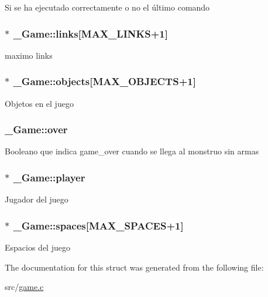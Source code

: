 Si se ha ejecutado correctamente o no el último comando \hypertarget{struct__Game_a672f97aff892c65a6fdb43665cb57c97}{
\subsubsection[{links}]{$\ast$ \+\_\+\+Game\+::links\mbox{[}{\bf M\+A\+X\+\_\+\+L\+I\+N\+K\+S}+1\mbox{]}}}\label{struct__Game_a672f97aff892c65a6fdb43665cb57c97}
maximo links \hypertarget{struct__Game_aa669bb857944c6c3b53504d179640af0}{
\subsubsection[{objects}]{$\ast$ \+\_\+\+Game\+::objects\mbox{[}{\bf M\+A\+X\+\_\+\+O\+B\+J\+E\+C\+T\+S}+1\mbox{]}}}\label{struct__Game_aa669bb857944c6c3b53504d179640af0}
Objetos en el juego \hypertarget{struct__Game_a49c591e59c0e694d7a6a996a786530c2}{
\subsubsection[{over}]{ \+\_\+\+Game\+::over}}\label{struct__Game_a49c591e59c0e694d7a6a996a786530c2}
Booleano que indica game\+\_\+over cuando se llega al monstruo sin armas \hypertarget{struct__Game_a31406605782d71ec00c4bf258ea76267}{
\subsubsection[{player}]{$\ast$ \+\_\+\+Game\+::player}}\label{struct__Game_a31406605782d71ec00c4bf258ea76267}
Jugador del juego \hypertarget{struct__Game_ab4180417d9148f8abb2233ca6c4ecfe5}{
\subsubsection[{spaces}]{$\ast$ \+\_\+\+Game\+::spaces\mbox{[}{\bf M\+A\+X\+\_\+\+S\+P\+A\+C\+E\+S}+1\mbox{]}}}\label{struct__Game_ab4180417d9148f8abb2233ca6c4ecfe5}
Espacios del juego 

The documentation for this struct was generated from the following file\+:\begin{DoxyCompactItemize}
\item 
src/\hyperlink{game_8c}{game.\+c}\end{DoxyCompactItemize}
